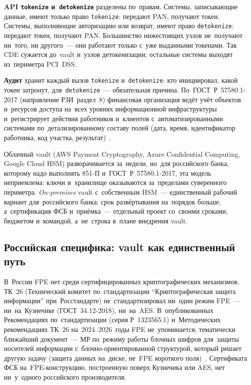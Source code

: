 \textbf{API \texttt{tokenize} и~\texttt{detokenize}} разделены по~правам.
Системы, записывающие данные, имеют только право \texttt{tokenize}: передают
PAN, получают токен. Системы, выполняющие авторизацию или возврат, имеют право
\texttt{detokenize}: передают токен, получают PAN. Большинство нижестоящих
узлов не~получают ни~того, ни другого~--- они работают только с~уже выданными
токенами. Так CDE сужается до~vault и~узлов детокенизации;
остальные системы выходят из~периметра PCI~DSS.

\textbf{Аудит} хранит каждый вызов \texttt{tokenize} и~\texttt{detokenize}: кто
инициировал, какой токен затронут, для~\texttt{detokenize}~--- обязательная
причина. По~ГОСТ~Р~57580.1-2017 (направление РЗИ~раздел~8) финансовая
организация ведёт учёт объектов и~ресурсов доступа на~всех уровнях
информационной инфраструктуры и~регистрирует действия работников и~клиентов
с~автоматизированными системами по~детализированному составу полей (дата,
время, идентификатор работника, код участка, результат)~\cite{gost-57580-1}.

Облачный vault (AWS Payment Cryptography, Azure Confidential Computing, Google
Cloud HSM) разворачивается за~недели, но~для российского банка, которому надо
выполнять 851-П и~ГОСТ~Р~57580.1-2017,
эта модель неприемлема: ключи и~хранилище оказываются за~пределами суверенного
периметра.
\textit{On-premises} vault с~собственным HSM~--- единственный рабочий вариант
для~российского банка; срок развёртывания на~порядок больше, а~сертификация ФСБ
и~приёмка~--- отдельный проект со~своими сроками, бюджетом и~командой,
а~не~строка в~плане внедрения vault.

\subsection*{Российская специфика: vault как единственный путь}

В~России FPE нет среди сертифицированных криптографических механизмов. ТК~26
(Технический комитет по~стандартизации \enquote{Криптографическая защита
информации} при~Росстандарте) не~стандартизировал ни~один режим FPE~---
ни~на~Кузнечике (ГОСТ~34.12-2018), ни~на~AES. В~опубликованных Рекомендациях
по~стандартизации (серия Р~1323565.1) и~Методических рекомендациях ТК~26
на~2024--2026~годы FPE не~упоминается; тематически ближайший документ~--- МР
по~режиму работы блочных шифров для~защиты носителей информации
с~блочно-ориентированной структурой, который решает другую задачу (защита
данных на~диске, не~FPE короткого поля)~\cite{tc26-recommendations}.
Сертификата ФСБ на~FPE-конструкцию, построенную поверх Кузнечика или AES, нет
ни~у~одного российского производителя.


